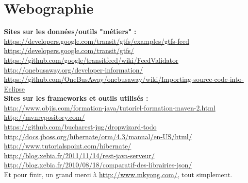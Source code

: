 \chapter*{Webographie}
\label{Bibliographie}


\textbf{Sites sur les données/outils "métiers" :}\label{OBA}\\


\url{https://developers.google.com/transit/gtfs/examples/gtfs-feed}\\

\url{https://developers.google.com/transit/gtfs/}\\

\url{https://github.com/google/transitfeed/wiki/FeedValidator}\\

\url{http://onebusaway.org/developer-information/}\\

\url{https://github.com/OneBusAway/onebusaway/wiki/Importing-source-code-into-Eclipse}\\


\textbf{Sites sur les frameworks et outils utilisés :}\\


\url{http://www.objis.com/formation-java/tutoriel-formation-maven-2.html}\\

\url{http://mvnrepository.com/}\\

\url{https://github.com/bucharest-jug/dropwizard-todo}\\

\url{http://docs.jboss.org/hibernate/orm/4.3/manual/en-US/html/}\\

\url{http://www.tutorialspoint.com/hibernate/}\\

\url{http://blog.xebia.fr/2011/11/14/rest-java-serveur/}\\

\url{http://blog.xebia.fr/2010/08/18/comparatif-des-librairies-json/}\\


Et pour finir, un grand merci à \url{http://www.mkyong.com/}, tout simplement.
